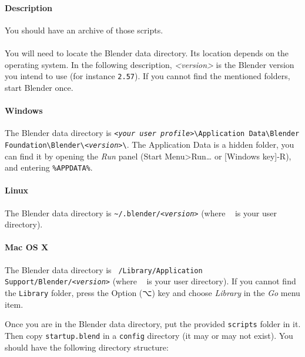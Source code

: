 \documentclass{article}
\begin{document}
	\paragraph{Description} You should have an archive of those scripts.

	\paragraph{}
	You will need to locate the Blender data directory. Its location depends on
	the operating system. In the following description, \emph{<version>} is the
	Blender version you intend to use (for instance \texttt{2.57}). If you cannot find the mentioned folders, start Blender once.

	\paragraph{Windows} The Blender data directory is \texttt{\emph{<your user profile>}\textbackslash{}Application Data\textbackslash{}Blender Foundation\textbackslash{}Blender\textbackslash{}\emph{<version>}\textbackslash{}}. The Application Data is a hidden folder, you can find it by opening the \emph{Run} panel (Start Menu>Run… or [Windows key]-R), and entering \texttt{\%APPDATA\%}. 

	\paragraph{Linux} The Blender data directory is \texttt{\~ {}/.blender/\emph{<version>}} (where \texttt{~} is your user directory).
	
	\paragraph{Mac OS X} The Blender data directory is \texttt{~/Library/Application Support/Blender/\emph{<version>}} (where \texttt{~} is your user directory). If you cannot find the \texttt{Library} folder, press the Option (⌥) key and choose \emph{Library} in the \emph{Go} menu item.
	
	Once you are in the Blender data directory, put the provided \texttt{scripts} folder in it. Then copy \texttt{startup.blend} in a \texttt{config} directory (it may or may not exist). You should have the following directory structure:\\

\end{document}
